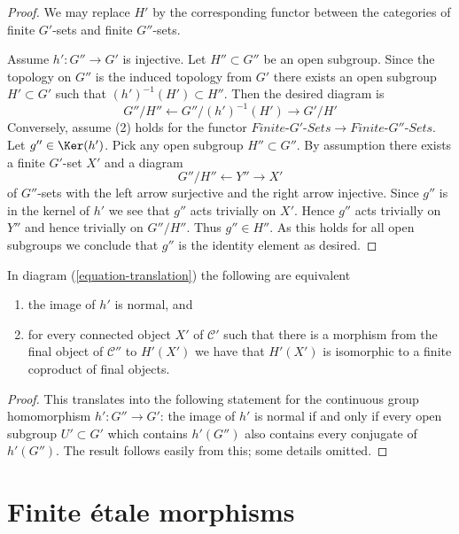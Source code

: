 \begin{proof}
We may replace $H'$ by the corresponding functor between the categories
of finite $G'$-sets and finite $G''$-sets.

\medskip\noindent
Assume $h' : G'' \to G'$ is injective. Let $H'' \subset G''$
be an open subgroup. Since the topology on $G''$ is the induced
topology from $G'$ there exists an open subgroup $H' \subset G'$
such that $(h')^{-1}(H') \subset H''$.
Then the desired diagram is
$$
G''/H'' \leftarrow G''/(h')^{-1}(H') \rightarrow G'/H'
$$
Conversely, assume (2) holds for the functor
$\textit{Finite-}G'\textit{-Sets} \to \textit{Finite-}G''\textit{-Sets}$.
Let $g'' \in \Ker(h')$. Pick any open subgroup $H'' \subset G''$.
By assumption there exists a finite $G'$-set $X'$ and a diagram
$$
G''/H'' \leftarrow Y'' \rightarrow X'
$$
of $G''$-sets with the left arrow surjective and the right arrow injective.
Since $g''$ is in the kernel of $h'$ we see that $g''$ acts trivially on $X'$.
Hence $g''$ acts trivially on $Y''$ and hence trivially on $G''/H''$.
Thus $g'' \in H''$. As this holds for all open subgroups we conclude
that $g''$ is the identity element as desired.
\end{proof}

\begin{lemma}
\label{lemma-functoriality-galois-normal}
In diagram (\ref{equation-translation}) the following are equivalent
\begin{enumerate}
\item the image of $h'$ is normal, and
\item for every connected object $X'$ of $\mathcal{C}'$ such that
there is a morphism from the final object of $\mathcal{C}''$
to $H'(X')$ we have that $H'(X')$ is isomorphic to a finite coproduct
of final objects.
\end{enumerate}
\end{lemma}

\begin{proof}
This translates into the following statement for the continuous
group homomorphism $h' : G'' \to G'$: the image of $h'$ is normal
if and only if every open subgroup $U' \subset G'$ which
contains $h'(G'')$ also contains every conjugate of $h'(G'')$.
The result follows easily from this; some details omitted.
\end{proof}






\section{Finite \'etale morphisms}
\label{section-finite-etale}

